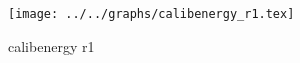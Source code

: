 \begin{figure}[h] \centering\texttt{[image: ../../graphs/calibenergy\_r1.tex]}\caption{calibenergy r1}\label{gr:calibenergy_r1} \end{figure}
